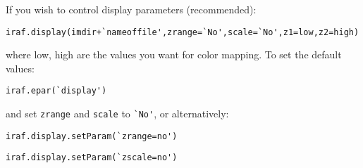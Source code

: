 \documentclass{article}
\begin{document}
If you wish to control display parameters (recommended):
\begin{itemize*}
    \item \verb|iraf.display(imdir+`nameoffile',zrange=`No',scale=`No',z1=low,z2=high)|
\end{itemize*}
where low, high are the values you want for color mapping.
To set the default values:
\begin{itemize*}
    \item \verb|iraf.epar(`display')|
\end{itemize*}
and set \verb|zrange| and \verb|scale| to \verb|`No'|, or alternatively:
\begin{itemize*}
    \item \verb|iraf.display.setParam(`zrange=no')|
    \item \verb|iraf.display.setParam(`zscale=no')|
\end{itemize*}
\end{document}
